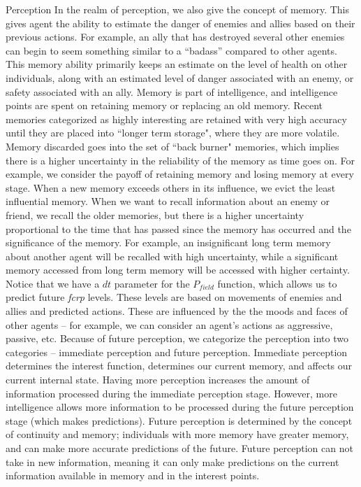 \documentclass[11pt]{article}
\begin{document}
\begin{section}{Perception}
In the realm of perception, we also give the concept of memory. This gives agent the ability to estimate the danger of enemies and allies based on their previous actions. For example, an ally that has destroyed several other enemies can begin to seem something similar to a ``badass'' compared to other agents. This memory ability primarily keeps an estimate on the level of health on other individuals, along with an estimated level of danger associated with an enemy, or safety associated with an ally. Memory is part of intelligence, and intelligence points are spent on retaining memory or replacing an old memory. Recent memories categorized as highly interesting are retained with very high accuracy until they are placed into ``longer term storage", where they are more volatile. Memory discarded goes into the set of ``back burner" memories, which implies there is a higher uncertainty in the reliability of the memory as time goes on. For example, we consider the payoff of retaining memory and losing memory at every stage. When a new memory exceeds others in its influence, we evict the least influential memory. When we want to recall information about an enemy or friend, we recall the older memories, but there is a higher uncertainty proportional to the time that has passed since the memory has occurred and the significance of the memory. For example, an insignificant long term memory about another agent will be recalled with high uncertainty, while a significant memory accessed from long term memory will be accessed with higher certainty.\\

Notice that we have a $dt$ parameter for the $P_{field}$ function, which allows us to predict future \emph{fcrp} levels. These levels are based on movements of enemies and allies and predicted actions. These are influenced by the the moods and faces of other agents -- for example, we can consider an agent's actions as aggressive, passive, etc. Because of future perception, we categorize the perception into two categories -- immediate perception and future perception. Immediate perception determines the interest function, determines our current memory, and affects our current internal state. Having more perception increases the amount of information processed during the immediate perception stage. However, more intelligence allows more information to be processed during the future perception stage (which makes predictions). Future perception is determined by the concept of continuity and memory; individuals with more memory have greater memory, and can make more accurate predictions of the future. Future perception can not take in new information, meaning it can only make predictions on the current information available in memory and in the interest points. \\


\end{section}
\end{document}
